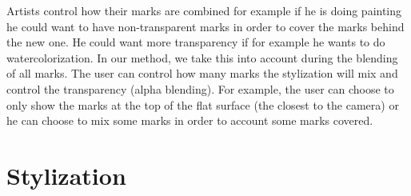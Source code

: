 Artists control how their marks are combined for example if he is doing painting he could want to have non-transparent marks in order to cover the marks behind the new one. He could want more transparency if for example he wants to do watercolorization. In our method, we take this into account during the blending of all marks. The user can control how many marks the stylization will mix and control the transparency (alpha blending). For example, the user can choose to only show the marks at the top of the flat surface (the closest to the camera) or he can choose to mix some marks in order to account some marks covered.


\section{Stylization}
